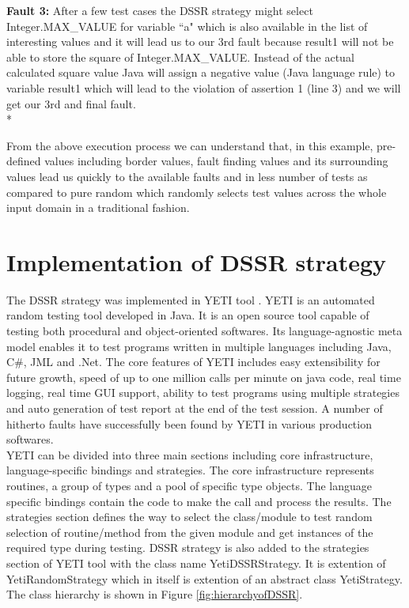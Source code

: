 \documentclass[10pt, conference, compsocconf]{IEEEtran}
\begin{document}
\textbf{Fault 3:} After a few test cases the DSSR strategy might select Integer.MAX\_VALUE for variable ``a" which is also available in the list of interesting values and it will lead us to our 3rd fault because result1 will not be able to store the square of Integer.MAX\_VALUE. Instead of the actual calculated square value Java will assign a negative value (Java language rule) to variable result1 which will lead to the violation of assertion 1 (line 3) and we will get our 3rd and final fault.\\*


From the above execution process we can understand that, in this example, pre-defined values including border values, fault finding values and its surrounding values lead us quickly to the available faults and in less number of tests as compared to pure random which randomly selects test values across the whole input domain in a traditional fashion.

\section{Implementation of DSSR strategy}

The DSSR strategy was implemented in YETI tool \cite{Oriol2011}. YETI is an automated random testing tool developed in Java. It is an open source tool capable of testing both procedural and object-oriented softwares. Its language-agnostic meta model enables it to test programs written in multiple languages including Java, C\#, JML and .Net. The core features of YETI includes easy extensibility for future growth, speed of up to one million calls per minute on java code, real time logging, real time GUI support, ability to test programs using multiple strategies and auto generation of test report at the end of the test session. A number of hitherto faults have successfully been found by YETI in various production softwares. \\

YETI can be divided into three main sections including core infrastructure, language-specific bindings and strategies. The core infrastructure represents routines, a group of types and a pool of specific type objects. The  language specific bindings contain the code to make the call and process the results. The strategies section defines the way to select the class/module to test random selection of routine/method from the given module and get instances of the required type during testing. DSSR strategy is also added to the strategies section of YETI tool with the class name YetiDSSRStrategy. It is extention of YetiRandomStrategy which in itself is extention of an abstract class YetiStrategy. The class hierarchy is shown in Figure \ref{fig:hierarchyofDSSR}.\\
\end{document}
